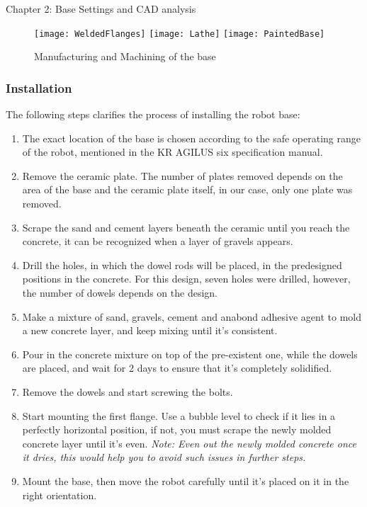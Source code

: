 \documentclass{book}
\begin{document}
\begin{chapter}{Chapter 2: Base Settings and CAD analysis}
\begin{figure}[H]
\begin{center}
	\texttt{[image: WeldedFlanges]}
	\texttt{[image: Lathe]}
	\texttt{[image: PaintedBase]}
	\caption{Manufacturing and Machining of the base}
\end{center}
\end{figure}

\subsubsection{Installation}

The following steps clarifies the process of installing the robot base:
\begin{enumerate}
	\item The exact location of the base is chosen according to the safe operating range of the robot, mentioned in the KR AGILUS six specification manual.
	\item Remove the ceramic plate. The number of plates removed depends on the area of the base and the ceramic plate itself, in our case, only one plate was removed.
	\item Scrape the sand and cement layers beneath the ceramic until you reach the concrete, it can be recognized when a layer of gravels appears.
	\item Drill the holes, in which the dowel rods will be placed, in the predesigned positions in the concrete. For this design, seven holes were drilled, however, the number of dowels depends on the design.
	\item Make a mixture of sand, gravels, cement and anabond adhesive agent to mold a new concrete layer, and keep mixing until it’s consistent.
	\item Pour in the concrete mixture on top of the pre-existent one, while the dowels are placed, and wait for 2 days to ensure that it’s completely solidified.
	\item Remove the dowels and start screwing the bolts.
    \item Start mounting the first flange. Use a bubble level to check if it lies in a perfectly horizontal position, if not, you must scrape the newly molded concrete layer until it’s even. 
	\textit{\newline Note: Even out the newly molded concrete once it dries, this would help you to avoid such issues in further steps.}
	\item Mount the base, then move the robot carefully until it’s placed on it in the right orientation.
\end{enumerate}


\end{chapter}
\end{document}
